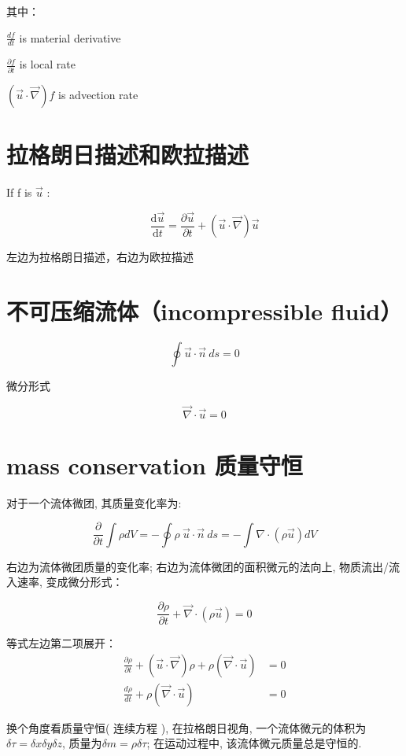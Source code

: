 \documentclass[fontset=windows]{report}
\begin{document}
其中：

\(\frac{df}{dt}\) is material derivative

\(\frac{\partial f}{\partial t}\) is local rate

\((\vec{u}\cdot\vec{\nabla})f\) is advection rate

\section{拉格朗日描述和欧拉描述}
If f is \(\vec{u}\) :

\[\frac{\mathrm{d}\vec{u}}{\mathrm{d}t}=\frac{\partial \vec{u}}{\partial t}+(\vec{u}\cdot\vec{\nabla})\vec{u}\]

左边为拉格朗日描述，右边为欧拉描述


\section{不可压缩流体（incompressible fluid）}

\[\oint\vec{u}\cdot\vec n \ ds=0\]

微分形式

\[\vec\nabla \cdot \vec u=0\]

\section{mass conservation 质量守恒}

对于一个流体微团, 其质量变化率为:

\[\frac{\partial}{\partial t}\int\rho dV
=-\oint\rho\  \vec u\cdot\vec n\ ds=-\int\nabla\cdot(\rho\vec u)dV\]

右边为流体微团质量的变化率; 右边为流体微团的面积微元的法向上,
物质流出/流入速率, 变成微分形式：

\[\frac{\partial \rho}{\partial t}+\vec \nabla\cdot(\rho\vec u)=0\]

等式左边第二项展开：
\begin{equation}
  \begin{aligned}
    \frac{\partial \rho}{\partial t}
    +(\vec u \cdot \vec \nabla)\rho+\rho(\vec \nabla\cdot\vec u)&=0\\
    \frac{d \rho}{dt}+\rho(\vec \nabla\cdot\vec u)&=0
    \end{aligned}
\end{equation}


换个角度看质量守恒( 连续方程 ), 在拉格朗日视角,
一个流体微元的体积为\(\delta \tau=\delta x\delta y\delta z\),
质量为\(\delta m = \rho \delta \tau\); 在运动过程中,
该流体微元质量总是守恒的.
\end{document}
